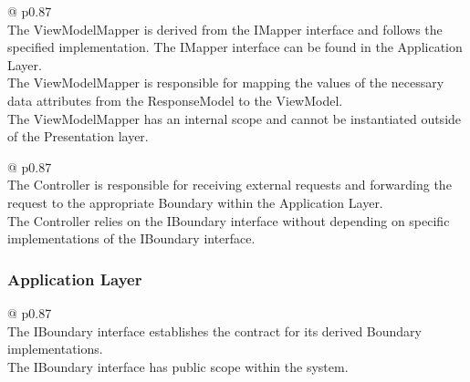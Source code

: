 \begin{table}[H]
    \begin{tabular}{@{\makebox[2em][c]{\rownumber\space}}  p{0.87\linewidth}}
        \\ 
    \hline
    The ViewModelMapper is derived from the IMapper interface and follows the specified
    implementation. The IMapper interface can be found in the Application Layer. \\

    The ViewModelMapper is responsible for mapping the values of the necessary data
    attributes from the ResponseModel to the ViewModel. \\
    
    The ViewModelMapper has an internal scope and cannot be instantiated outside of the
    Presentation layer. \\
    \hline
    \end{tabular}
\caption{ViewModelMapper Requirements}
\label{table_requirements_viewModelMapper}
\end{table}

\begin{table}[H]
    \begin{tabular}{@{\makebox[2em][c]{\rownumber\space}}  p{0.87\linewidth}}
        \\ 
    \hline
    The Controller is responsible for receiving external requests and forwarding the
    request to the appropriate Boundary within the Application Layer. \\

    The Controller relies on the IBoundary interface without depending on specific
    implementations of the IBoundary interface. \\
    \hline
    \end{tabular}
\caption{Controller Requirements}
\label{table_requirements_controlle}
\end{table}

\subsubsection*{Application Layer}

\begin{table}[H]
    \begin{tabular}{@{\makebox[2em][c]{\rownumber\space}}  p{0.87\linewidth}}
        \\ 
    \hline
    The IBoundary interface establishes the contract for its derived Boundary implementations. \\

    The IBoundary interface has public scope within the system. \\
    \hline
    \end{tabular}
\caption{IBoundary Requirements}
\label{table_requirements_iboundary}
\end{table}

